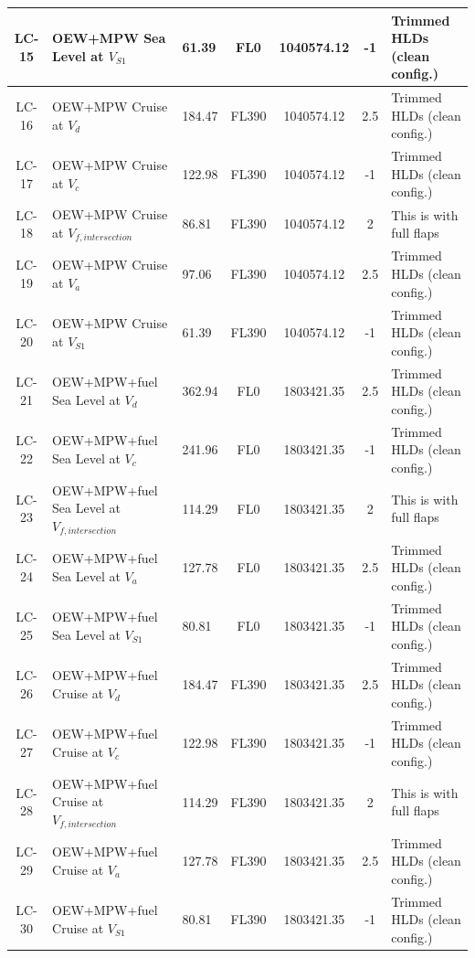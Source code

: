 \begin{longtable}{|>{\columncolor{blue!15}}c|p{3.2cm}|p{2cm}|c|c|c|p{2.6cm}|}
    \hline
    LC-15 & OEW+MPW Sea Level at $V_{S1}$ & 61.39 & FL0 & 1040574.12& -1 & Trimmed HLDs (clean config.) \\ 
    \hline
    LC-16 & OEW+MPW Cruise at $V_{d}$ & 184.47 & FL390 & 1040574.12 & 2.5 & Trimmed HLDs (clean config.) \\ 
    \hline
    LC-17 & OEW+MPW Cruise at $V_{c}$ & 122.98 & FL390 & 1040574.12 & -1 & Trimmed HLDs (clean config.) \\ 
    \hline
    LC-18 & OEW+MPW Cruise at $V_{f,intersection}$ & 86.81 & FL390 & 1040574.12 & 2 & This is with full flaps \\ 
    \hline
    LC-19 & OEW+MPW Cruise at $V_{a}$ & 97.06 & FL390 & 1040574.12 & 2.5 & Trimmed HLDs (clean config.) \\ 
    \hline
    LC-20 & OEW+MPW Cruise at $V_{S1}$ & 61.39 & FL390 & 1040574.12 & -1 & Trimmed HLDs (clean config.) \\ 
    \hline
    LC-21 & OEW+MPW+fuel Sea Level at $V_{d}$ & 362.94 & FL0 & 1803421.35 & 2.5 & Trimmed HLDs (clean config.) \\ 
    \hline
    LC-22 & OEW+MPW+fuel Sea Level at $V_{c}$ & 241.96 & FL0 & 1803421.35 & -1 & Trimmed HLDs (clean config.) \\ 
    \hline
    LC-23 & OEW+MPW+fuel Sea Level at $V_{f,intersection}$ & 114.29 & FL0 & 1803421.35 & 2 & This is with full flaps \\ 
    \hline
    LC-24 & OEW+MPW+fuel Sea Level at $V_{a}$ & 127.78 & FL0 & 1803421.35 & 2.5 & Trimmed HLDs (clean config.) \\ 
    \hline
    LC-25 & OEW+MPW+fuel Sea Level at $V_{S1}$ & 80.81 & FL0 & 1803421.35 & -1 & Trimmed HLDs (clean config.) \\ 
    \hline
    LC-26 & OEW+MPW+fuel Cruise at $V_{d}$ & 184.47 & FL390 & 1803421.35 & 2.5 & Trimmed HLDs (clean config.) \\ 
    \hline
    LC-27 & OEW+MPW+fuel Cruise at $V_{c}$ & 122.98 & FL390 & 1803421.35 & -1 & Trimmed HLDs (clean config.) \\ 
    \hline
    LC-28 & OEW+MPW+fuel Cruise at $V_{f,intersection}$ & 114.29 & FL390 & 1803421.35 & 2 & This is with full flaps \\ 
    \hline
    LC-29 & OEW+MPW+fuel Cruise at $V_{a}$ & 127.78 & FL390 & 1803421.35 & 2.5 & Trimmed HLDs (clean config.) \\ 
    \hline
    LC-30 & OEW+MPW+fuel Cruise at $V_{S1}$ & 80.81 & FL390 & 1803421.35 & -1 & Trimmed HLDs (clean config.) \\ 
    \hline
\end{longtable}



